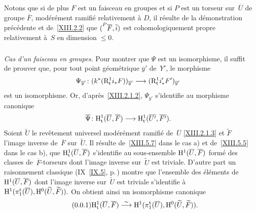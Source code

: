 Notons que si de plus $F$ est un faisceau en groupes et si $P$ est un
torseur sur~$\overline{U}$ de groupe $\overline{F}$,
mod\'er\'ement ramifi\'e relativement \`a $D$, il r\'esulte
de la d\'emonstration pr\'ec\'edente et de~\ref{XIII.2.2} que
$(\leftexp{P}{\overline{F}},\overline{i})$ est cohomologiquement
propre relativement \`a~$S$ en dimension $\leq 0$.

\subsubsection{}
\label{XIII.2.4.3}
\emph{Cas d'un faisceau en groupes.} Pour montrer que $\Psi$ est un
isomorphisme, il suffit de prouver que, pour tout point
g\'eom\'etrique $\overline{y}'$ de~$Y'$, le morphisme
$$
\Psi_{\overline{y}'}\colon
(k^*(\R^1_{\tame}i_*F))_{\overline{y}'}\to (\R^1_{\tame}
i_*'F')_{\overline{y}'}
$$
est un isomorphisme. Or, d'apr\`es~\ref{XIII.2.1.2},
$\Psi_{\overline{y}'}$ s'identifie au morphisme canonique
$$
\overline{\Psi}\colon
\H^1_{\tame}(\overline{U},\overline{F})\to
\H^1_{\tame}(\overline{U'},\overline{F'}).
$$
Soient $\widetilde{U}$ le rev\^etement universel mod\'er\'ement
ramifi\'e de~$\overline{U}$ \eqref{XIII.2.1.3} et $\widetilde{F}$
l'image inverse de~$\overline{F}$ sur~$\widetilde{U}$. Il r\'esulte
de~\ref{XIII.5.7} dans le cas a) et de~\ref{XIII.5.5} dans le cas b),
que $\mathrm{H}^1_{\mathrm{t}}(\overline{U},\overline{F})$ s'identifie au
sous-ensemble $\mathrm{H}^1(\overline{U},\overline{F})$ form\'e des classes
de~$\overline{F}$-torseurs dont l'image inverse sur~$\widetilde{U}$
est triviale. D'autre part un raisonnement
classique (\cf IX~\ref{IX.5}, p.\,\pageref{page-300})
montre que
l'ensemble des \'el\'ements de~$\mathrm{H}^1(\overline{U},\overline{F})$
dont l'image inverse sur~$\widetilde{U}$ est triviale s'identifie
\`a
$\mathrm{H}^1(\pi_1^{\mathrm{t}}(\overline{U}),\mathrm{H}^0(\widetilde{U},\widetilde{F})).$
On obtient ainsi un isomorphisme canonique
\begin{equation*}
\label{eq:XIII.2.4.3.1} \tag{\thesubsubsection.1} {}
\H^1_{\tame}(\overline{U},\overline{F})\isomto
\H^1(\pi_1^{\tame}(\overline{U}),\H^0(\widetilde{U},\widetilde{F})).
\end{equation*}

